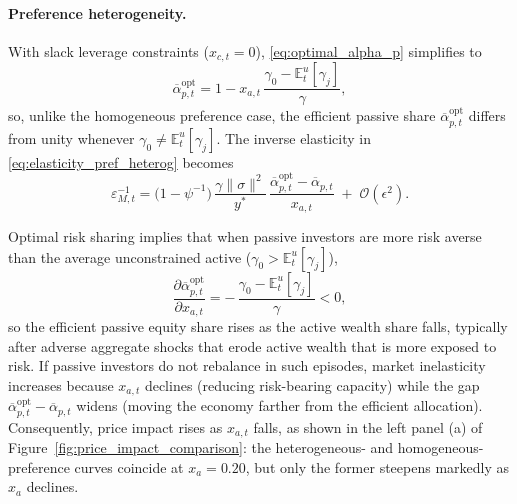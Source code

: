 \paragraph{Preference heterogeneity.}
With slack leverage constraints ($x_{c,t}=0$), \eqref{eq:optimal_alpha_p} simplifies to
\[
\overline{\alpha}_{p,t}^{\mathrm{opt}}
= 1 - x_{a,t}\,\frac{\gamma_0-\mathbb{E}^u_t[\gamma_j]}{\gamma},
\]
so, unlike the homogeneous preference case, the efficient passive share $\overline{\alpha}_{p,t}^{\mathrm{opt}}$ differs from unity whenever $\gamma_0 \neq \mathbb{E}^u_t[\gamma_j]$. The inverse elasticity in \eqref{eq:elasticity_pref_heterog} becomes
\[
\varepsilon_{M,t}^{-1}
= \bigl(1-\psi^{-1}\bigr)\,\frac{\gamma\|\sigma\|^2}{y^*}\,
\frac{\overline{\alpha}_{p,t}^{\mathrm{opt}}-\overline{\alpha}_{p,t}}{x_{a,t}}
\;+\;\mathcal{O}(\epsilon^2).
\]

Optimal risk sharing implies that when passive investors are more risk averse than the average unconstrained active ($\gamma_0>\mathbb{E}^u_t[\gamma_j]$),
\[
\frac{\partial \overline{\alpha}_{p,t}^{\mathrm{opt}}}{\partial x_{a,t}}
= -\,\frac{\gamma_0-\mathbb{E}^u_t[\gamma_j]}{\gamma} < 0,
\]
so the efficient passive equity share rises as the active wealth share falls, typically after adverse aggregate shocks that erode active wealth that is more exposed to risk. If passive investors do not rebalance in such episodes, market inelasticity increases because $x_{a,t}$ declines (reducing risk-bearing capacity) while the gap $\overline{\alpha}_{p,t}^{\mathrm{opt}}-\overline{\alpha}_{p,t}$ widens (moving the economy farther from the efficient allocation). Consequently, price impact rises as $x_{a,t}$ falls, as shown in the left panel (a) of Figure~\ref{fig:price_impact_comparison}: the heterogeneous- and homogeneous-preference curves coincide at $x_{a}=0.20$, but only the former steepens markedly as $x_a$ declines.


